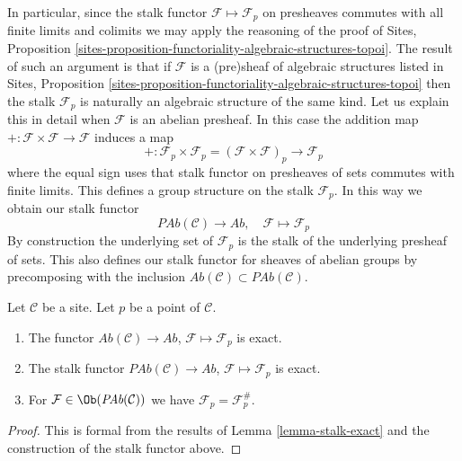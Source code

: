 \noindent
In particular, since the stalk functor $\mathcal{F} \mapsto \mathcal{F}_p$
on presheaves commutes with all finite limits and colimits we may apply the
reasoning of the proof of
Sites,
Proposition \ref{sites-proposition-functoriality-algebraic-structures-topoi}.
The result of such an argument is that if $\mathcal{F}$ is a
(pre)sheaf of algebraic structures listed in
Sites,
Proposition \ref{sites-proposition-functoriality-algebraic-structures-topoi}
then the stalk $\mathcal{F}_p$ is naturally an algebraic structure
of the same kind. Let us explain this in detail when $\mathcal{F}$
is an abelian presheaf. In this case the addition map
$+ : \mathcal{F} \times \mathcal{F} \to \mathcal{F}$ induces
a map
$$
+ :
\mathcal{F}_p \times \mathcal{F}_p
=
(\mathcal{F} \times \mathcal{F})_p
\longrightarrow
\mathcal{F}_p
$$
where the equal sign uses that stalk functor on presheaves of sets
commutes with finite limits. This defines a group structure on
the stalk $\mathcal{F}_p$. In this way we obtain
our stalk functor
$$
\textit{PAb}(\mathcal{C}) \longrightarrow \textit{Ab}, \quad
\mathcal{F} \longmapsto \mathcal{F}_p
$$
By construction the underlying set of $\mathcal{F}_p$ is the stalk of the
underlying presheaf of sets. This also defines our stalk functor for
sheaves of abelian groups by precomposing with the inclusion
$\textit{Ab}(\mathcal{C}) \subset \textit{PAb}(\mathcal{C})$.

\begin{lemma}
\label{lemma-stalk-exact-abelian}
Let $\mathcal{C}$ be a site.
Let $p$ be a point of $\mathcal{C}$.
\begin{enumerate}
\item The functor
$\textit{Ab}(\mathcal{C}) \to \textit{Ab}$,
$\mathcal{F} \mapsto \mathcal{F}_p$ is exact.
\item The stalk functor
$\textit{PAb}(\mathcal{C}) \to \textit{Ab}$,
$\mathcal{F}  \mapsto  \mathcal{F}_p$
is exact.
\item For $\mathcal{F} \in \Ob(\textit{PAb}(\mathcal{C}))$
we have $\mathcal{F}_p = \mathcal{F}^\#_p$.
\end{enumerate}
\end{lemma}

\begin{proof}
This is formal from the results of
Lemma \ref{lemma-stalk-exact}
and the construction of the stalk functor above.
\end{proof}

